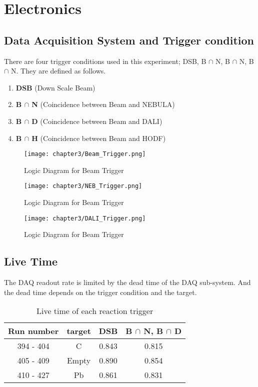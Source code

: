 \section{Electronics}
\subsection{Data Acquisition System and Trigger condition}
There are four trigger conditions used in this experiment; DSB, B $\cap$ N, B $\cap$ N, B $\cap$ N. They are defined as follows.
\begin{enumerate}
    \item \textbf{DSB} (Down Scale Beam) 
    \item \textbf{B $\cap$ N} (Coincidence between Beam and NEBULA)
    \item \textbf{B $\cap$ D} (Coincidence between Beam and DALI)
    \item \textbf{B $\cap$ H} (Coincidence between Beam and HODF)
\end{enumerate} 

\begin{figure}[h]
    \centering
    \hspace{1cm}
    \texttt{[image: chapter3/Beam\_Trigger.png]}
    \caption{Logic Diagram for Beam Trigger}
\end{figure}

\begin{figure}
    \centering
    \texttt{[image: chapter3/NEB\_Trigger.png]}
    \caption{Logic Diagram for Beam Trigger}    
\end{figure}

\begin{figure}
    \centering
    \texttt{[image: chapter3/DALI\_Trigger.png]}
    \caption{Logic Diagram for Beam Trigger}
\end{figure}

\subsection{Live Time}
The DAQ readout rate is limited by the dead time of the DAQ sub-system. And the dead time depends on the trigger condition and the target.  
\begin{table}[h]
    \centering
    \begin{tabular}{c|c|cc}
        \hline
        Run number & target & DSB & B $\cap$ N, B $\cap$ D \\
        \hline
        394 - 404 & C & 0.843 & 0.815 \\
        405 - 409 & Empty & 0.890 & 0.854 \\
        410 - 427 & Pb & 0.861 & 0.831 \\
        \hline
    \end{tabular}
    \caption{Live time of each reaction trigger}
\end{table}
